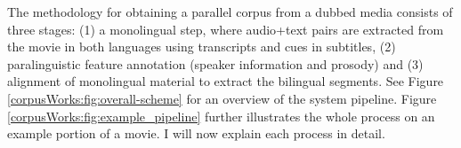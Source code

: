 
The methodology for obtaining a parallel corpus from a dubbed media consists of three stages: (1) a monolingual step, where audio+text pairs are extracted from the movie in both languages using transcripts and cues in subtitles, (2) paralinguistic feature annotation (speaker information and prosody) and (3) alignment of monolingual material to extract the bilingual segments. See Figure \ref{corpusWorks:fig:overall-scheme} for an overview of the system pipeline. Figure \ref{corpusWorks:fig:example_pipeline} further illustrates the whole process on an example portion of a movie. I will now explain each process in detail.


